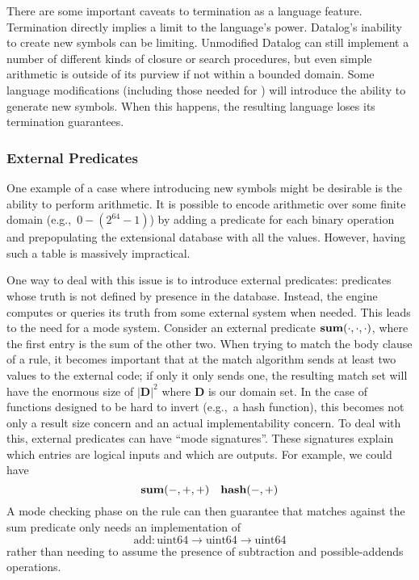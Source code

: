 There are some important caveats to termination as a language feature.
%
Termination directly implies a limit to the language's power.
Datalog's inability to create new symbols can be limiting.
Unmodified Datalog can still implement a number of different kinds of closure or search procedures, but even simple arithmetic is outside of its purview if not within a bounded domain.
%
Some language modifications (including those needed for \sysname) will introduce the ability to generate new symbols.
When this happens, the resulting language loses its termination guarantees.
\subsubsection{External Predicates}
\label{sec:extpred}
One example of a case where introducing new symbols might be desirable is the ability to perform arithmetic.
It is possible to encode arithmetic over some finite domain (e.g.,\ $0-(2^{64} - 1)$) by adding a predicate for each binary operation and prepopulating the extensional database with all the values.
However, having such a table is massively impractical.

One way to deal with this issue is to introduce external predicates: predicates whose truth is not defined by presence in the database.
Instead, the engine computes or queries its truth from some external system when needed.
This leads to the need for a mode system.
Consider an external predicate ${\bf sum}(\cdot, \cdot, \cdot)$, where the first entry is the sum of the other two.
When trying to match the body clause of a rule, it becomes important that at the match algorithm sends at least two values to the external code; if only it only sends one, the resulting match set will have the enormous size of $|\mathbf{D}|^2$ where $\mathbf{D}$ is our domain set.
In the case of functions designed to be hard to invert (e.g.,\ a hash function), this becomes not only a result size concern and an actual implementability concern.
To deal with this, external predicates can have ``mode signatures''.
These signatures explain which entries are logical inputs and which are outputs.
For example, we could have
\[
        {\bf sum}(-, +, +) \quad {\bf hash}(-, +)
\]
A mode checking phase on the rule can then guarantee that matches against the sum predicate only needs an implementation of
\[
        \textrm{add} : \textrm{uint64} \rightarrow \textrm{uint64} \rightarrow \textrm{uint64}
\]
rather than needing to assume the presence of subtraction and possible-addends operations.

